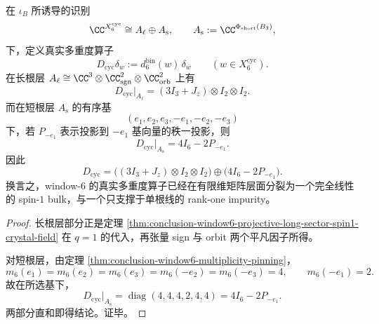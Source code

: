 \begin{theorem}\label{thm:conclusion-window6-true-multiplicity-zeeman-impurity-splitting}
在 \(\iota_B\) 所诱导的识别
\[
\CC^{X_6^{\mathrm{cyc}}}\cong A_{\ell}\oplus A_{\mathrm{s}},
\qquad
A_{\mathrm{s}}:=\CC^{\Phi_{\mathrm{short}}(B_3)},
\]
下，定义真实多重度算子
\[
D_{\mathrm{cyc}}\delta_w:=d_6^{\mathrm{bin}}(w)\,\delta_w
\qquad
(w\in X_6^{\mathrm{cyc}}).
\]
在长根层 \(A_{\ell}\cong \CC^3\otimes \CC^2_{\mathrm{sgn}}\otimes \CC^2_{\mathrm{orb}}\) 上有
\[
D_{\mathrm{cyc}}\big|_{A_{\ell}}
=
(3I_3+J_z)\otimes I_2\otimes I_2.
\]
而在短根层 \(A_{\mathrm{s}}\) 的有序基
\[
(e_1,e_2,e_3,-e_1,-e_2,-e_3)
\]
下，若 \(P_{-e_1}\) 表示投影到 \(-e_1\) 基向量的秩一投影，则
\[
D_{\mathrm{cyc}}\big|_{A_{\mathrm{s}}}=4I_6-2P_{-e_1}.
\]
因此
\[
D_{\mathrm{cyc}}
=
\bigl((3I_3+J_z)\otimes I_2\otimes I_2\bigr)
\oplus
\bigl(4I_6-2P_{-e_1}\bigr).
\]
换言之，window-\(6\) 的真实多重度算子已经在有限维矩阵层面分裂为一个完全线性的 spin-\(1\) bulk，与一个只支撑于单根线的 rank-one impurity。
\end{theorem}
\begin{proof}
长根层部分正是定理
\ref{thm:conclusion-window6-projective-long-sector-spin1-crystal-field}
在 \(q=1\) 的代入，再张量 sign 与 orbit 两个平凡因子所得。

对短根层，由定理 \ref{thm:conclusion-window6-multiplicity-pinning}，
\[
m_6(e_1)=m_6(e_2)=m_6(e_3)=m_6(-e_2)=m_6(-e_3)=4,
\qquad
m_6(-e_1)=2.
\]
故在所选基下，
\[
D_{\mathrm{cyc}}\big|_{A_{\mathrm{s}}}
=
\operatorname{diag}(4,4,4,2,4,4)
=
4I_6-2P_{-e_1}.
\]
两部分直和即得结论。证毕。
\end{proof}

